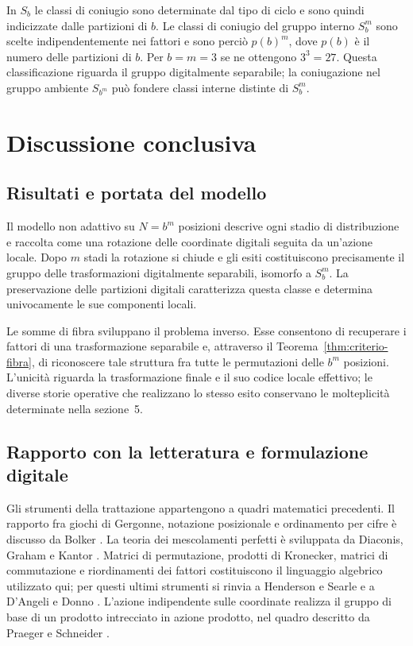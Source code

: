 	\begin{remark}
		In \(S_b\) le classi di coniugio sono determinate dal tipo di ciclo e sono
		quindi indicizzate dalle partizioni di \(b\). Le classi di coniugio del
		gruppo interno \(S_b^m\) sono scelte indipendentemente nei fattori e sono
		perciò \(p(b)^m\), dove \(p(b)\) è il numero delle partizioni di \(b\). Per \(b=m=3\) se ne ottengono \(3^3=27\).
		Questa classificazione riguarda il gruppo digitalmente separabile; la
		coniugazione nel gruppo ambiente \(S_{b^m}\) può fondere classi interne
		distinte di \(S_b^m\).
	\end{remark}

	\section{Discussione conclusiva}

	\subsection{Risultati e portata del modello}

	Il modello non adattivo su \(N=b^m\) posizioni descrive ogni stadio di
	distribuzione e raccolta come una rotazione delle coordinate digitali
	seguita da un'azione locale. Dopo \(m\) stadi la rotazione si chiude e gli
	esiti costituiscono precisamente il gruppo delle trasformazioni
	digitalmente separabili, isomorfo a \(S_b^m\). La preservazione delle
	partizioni digitali caratterizza questa classe e determina univocamente
	le sue componenti locali.

	Le somme di fibra sviluppano il problema inverso. Esse consentono di
	recuperare i fattori di una trasformazione separabile e, attraverso il
	Teorema~\ref{thm:criterio-fibra}, di riconoscere tale struttura fra tutte le
	permutazioni delle \(b^m\) posizioni. L'unicità riguarda la trasformazione
	finale e il suo codice locale effettivo; le diverse storie operative che
	realizzano lo stesso esito conservano le molteplicità determinate nella
	sezione~5.

	\subsection{Rapporto con la letteratura e formulazione digitale}

	Gli strumenti della trattazione appartengono a quadri matematici
	precedenti. Il rapporto fra giochi di Gergonne, notazione posizionale e
	ordinamento per cifre è discusso da Bolker \cite{bolker}. La teoria dei
	mescolamenti perfetti è sviluppata da Diaconis, Graham e Kantor
	\cite{diaconis-graham-kantor}. Matrici di permutazione, prodotti di
	Kronecker, matrici di commutazione e riordinamenti dei fattori
	costituiscono il linguaggio algebrico utilizzato qui; per questi ultimi
	strumenti si rinvia a Henderson e Searle \cite{henderson-searle} e a
	D'Angeli e Donno \cite{dangeli-donno}. L'azione indipendente sulle
	coordinate realizza il gruppo di base di un prodotto intrecciato in
	azione prodotto, nel quadro descritto da Praeger e Schneider
	\cite{praeger-schneider}.

